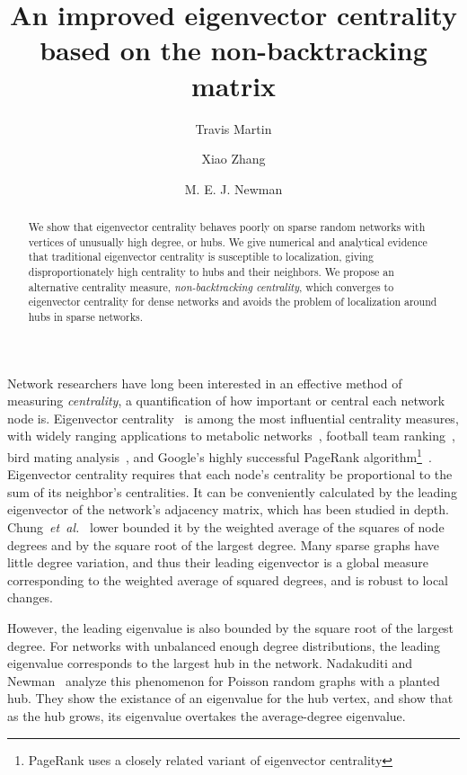 \documentclass[twocolumn,prl,superscriptaddress]{revtex4}
\newcommand{\etal}{{\it{}et~al.}}
\begin{document}
\title{An improved eigenvector centrality based on the non-backtracking matrix}
\author{Travis Martin}
\author{Xiao Zhang}
\author{M. E. J. Newman}

\begin{abstract}
  We show that eigenvector centrality behaves poorly on sparse random networks with vertices of unusually high degree, or hubs. We give numerical and analytical evidence that traditional eigenvector centrality is susceptible to localization, giving disproportionately high centrality to hubs and their neighbors. We propose an alternative centrality measure, \emph{non-backtracking centrality}, which converges to eigenvector centrality for dense networks and avoids the problem of localization around hubs in sparse networks.
\end{abstract}

\maketitle

Network researchers have long been interested in an effective method of measuring \emph{centrality}, a quantification of how important or central each network node is. Eigenvector centrality~\cite{bonacich72} is among the most influential centrality measures, with widely ranging applications to metabolic networks~\cite{ding10}, football team ranking~\cite{keener93}, bird mating analysis~\cite{ryder08}, and Google's highly successful PageRank algorithm\footnote{PageRank uses a closely related variant of eigenvector centrality}~\cite{brin98}. Eigenvector centrality requires that each node's centrality be proportional to the sum of its neighbor's centralities. It can be conveniently calculated by the leading eigenvector of the network's adjacency matrix, which has been studied in depth. Chung~\etal~\cite{chung03} lower bounded it by the weighted average of the squares of node degrees and by the square root of the largest degree. Many sparse graphs have little degree variation, and thus their leading eigenvector is a global measure corresponding to the weighted average of squared degrees, and is robust to local changes.

However, the leading eigenvalue is also bounded by the square root of the largest degree. For networks with unbalanced enough degree distributions, the leading eigenvalue corresponds to the largest hub in the network. Nadakuditi and Newman~\cite{nadakuditi13} analyze this phenomenon for Poisson random graphs with a planted hub. They show the existance of an eigenvalue for the hub vertex, and show that as the hub grows, its eigenvalue overtakes the average-degree eigenvalue.
\end{document}
